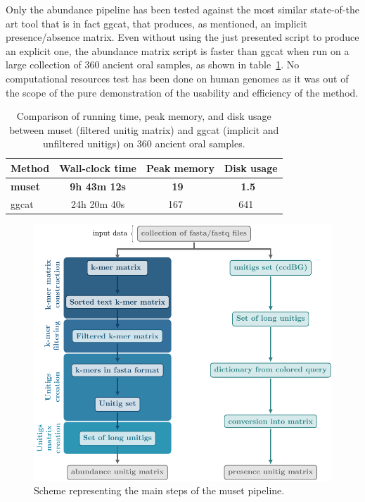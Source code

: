 Only the abundance pipeline has been tested against the most similar state-of-the art tool that is in fact ggcat, that produces, as mentioned, an implicit presence/absence matrix. Even without using the just presented script to produce an explicit one, the abundance matrix script is faster than ggcat when run on a large collection of 360 ancient oral samples, as shown in table~\ref{tab:muset_comparison}. No computational resources test has been done on human genomes as it was out of the scope of the pure demonstration of the usability and efficiency of the method. 

\begin{table}[!t]
	\centering
	\begin{tabular}{lccc}
		\toprule
		Method & Wall-clock time & Peak memory & Disk usage \\
		\midrule
		\textbf{muset} & \textbf{9h 43m 12s} & \textbf{\SI[detect-weight=true]{19}{\textbf{\giga\byte}}} & \textbf{\SI[detect-weight=true]{1.5}{\textbf{\tera\byte}}}\\
		ggcat & 24h 20m 40s & \SI{167}{\giga\byte} & \SI{641}{\giga\byte} \\
		\bottomrule
	\end{tabular}
	\caption{Comparison of running time, peak memory, and disk usage between muset (filtered unitig matrix) and ggcat (implicit and unfiltered unitigs) on 360 ancient oral samples.}\label{tab:muset_comparison}
\end{table}

\begin{figure}[h!]
	\centering
	\includegraphics[width=\linewidth]{figures/kmer_methods/muset_full.pdf}
	\caption[The muset pipeline]{Scheme representing the main steps of the muset pipeline.}
	\label{fig:muset}
\end{figure}

